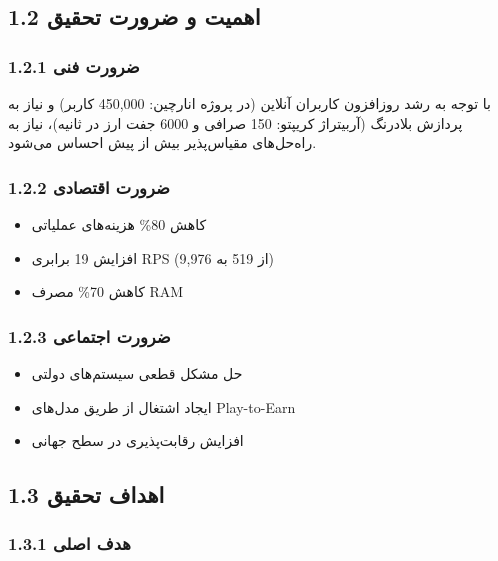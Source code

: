 \documentclass[
]{article}
\providecommand{\tightlist}{%
  \setlength{\itemsep}{0pt}\setlength{\parskip}{0pt}}
\begin{document}
\subsection{1.2 اهمیت و ضرورت
تحقیق}\label{ux627ux647ux645ux6ccux62a-ux648-ux636ux631ux648ux631ux62a-ux62aux62dux642ux6ccux642}

\subsubsection{1.2.1 ضرورت
فنی}\label{ux636ux631ux648ux631ux62a-ux641ux646ux6cc}

با توجه به رشد روزافزون کاربران آنلاین (در پروژه انارچین: 450,000 کاربر)
و نیاز به پردازش بلادرنگ (آربیتراژ کریپتو: 150 صرافی و 6000 جفت ارز در
ثانیه)، نیاز به راه‌حل‌های مقیاس‌پذیر بیش از پیش احساس می‌شود.

\subsubsection{1.2.2 ضرورت
اقتصادی}\label{ux636ux631ux648ux631ux62a-ux627ux642ux62aux635ux627ux62fux6cc}

\begin{itemize}
\tightlist
\item
  کاهش 80\% هزینه‌های عملیاتی
\item
  افزایش 19 برابری RPS (از 519 به 9,976)
\item
  کاهش 70\% مصرف RAM
\end{itemize}

\subsubsection{1.2.3 ضرورت
اجتماعی}\label{ux636ux631ux648ux631ux62a-ux627ux62cux62aux645ux627ux639ux6cc}

\begin{itemize}
\tightlist
\item
  حل مشکل قطعی سیستم‌های دولتی
\item
  ایجاد اشتغال از طریق مدل‌های Play-to-Earn
\item
  افزایش رقابت‌پذیری در سطح جهانی
\end{itemize}

\subsection{1.3 اهداف
تحقیق}\label{ux627ux647ux62fux627ux641-ux62aux62dux642ux6ccux642}

\subsubsection{1.3.1 هدف
اصلی}\label{ux647ux62fux641-ux627ux635ux644ux6cc}
\end{document}
